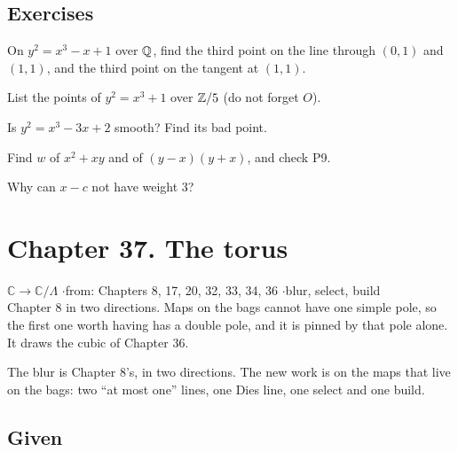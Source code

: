 \subsection*{Exercises}

\begin{lines}
\item[\lab{E1}] On $y^2 = x^3 - x + 1$ over $\mathbb{Q}$, find the third point on the line through $(0, 1)$ and $(1, 1)$, and the third point on the tangent at $(1, 1)$.
\item[\lab{E2}] List the points of $y^2 = x^3 + 1$ over $\mathbb{Z}/5$ (do not forget $O$).
\item[\lab{E3}] Is $y^2 = x^3 - 3x + 2$ smooth? Find its bad point.
\item[\lab{E4}] Find $w$ of $x^2 + xy$ and of $(y - x)(y + x)$, and check P9.
\item[\lab{E5}] Why can $x - c$ not have weight $3$?
\end{lines}

\newpage

\section*{Chapter 37. The torus}
\begin{center}
{\normalsize $\mathbb{C} \to \mathbb{C}/\Lambda$ \quad$\cdot$\quad from: Chapters 8, 17, 20, 32, 33, 34, 36 \quad$\cdot$\quad blur, select, build}\\[4pt]
{\small Chapter 8 in two directions. Maps on the bags cannot have one simple pole, so the first one worth having has a double pole, and it is pinned by that pole alone. It draws the cubic of Chapter 36.}
\end{center}

The blur is Chapter 8's, in two directions. The new work is on the maps that live on the bags: two ``at most one'' lines, one Dies line, one select and one build.

\subsection*{Given}

